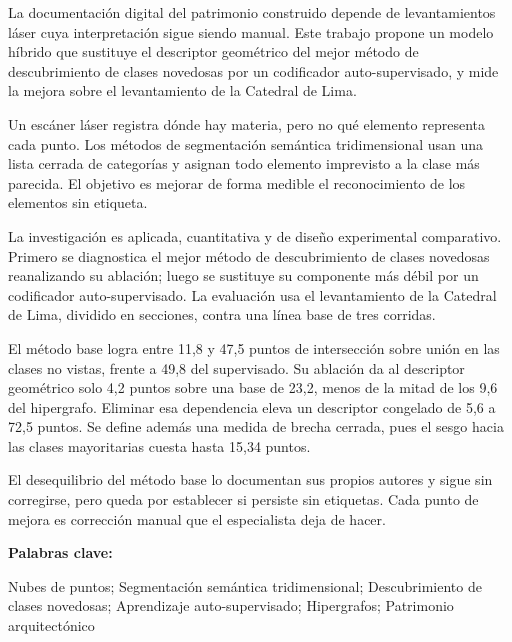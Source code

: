 
La documentación digital del patrimonio construido depende de levantamientos
láser cuya interpretación sigue siendo manual. Este trabajo propone un modelo
híbrido que sustituye el descriptor geométrico del mejor método de descubrimiento
de clases novedosas por un codificador auto-supervisado, y mide la mejora sobre
el levantamiento de la Catedral de Lima.

Un escáner láser registra dónde
hay materia, pero no qué elemento representa cada punto. Los métodos de
segmentación semántica tridimensional usan una lista cerrada de categorías y
asignan todo elemento imprevisto a la clase más parecida. El objetivo es
mejorar de forma medible el reconocimiento de los elementos sin etiqueta.

La investigación es aplicada, cuantitativa y
de diseño experimental comparativo. Primero se diagnostica el mejor método de
descubrimiento de clases novedosas reanalizando su ablación; luego se sustituye
su componente más débil por un codificador auto-supervisado. La evaluación usa
el levantamiento de la Catedral de Lima, dividido en secciones, contra una línea
base de tres corridas.

El método base logra entre 11,8 y 47,5 puntos de
intersección sobre unión en las clases no vistas, frente a 49,8 del supervisado.
Su ablación da al descriptor geométrico solo 4,2 puntos sobre una base de 23,2,
menos de la mitad de los 9,6 del hipergrafo. Eliminar esa dependencia eleva un
descriptor congelado de 5,6 a 72,5 puntos. Se define además una medida de
brecha cerrada, pues el sesgo hacia las clases mayoritarias cuesta hasta 15,34
puntos.

El desequilibrio del método base lo documentan sus
propios autores y sigue sin corregirse, pero queda por establecer si persiste
sin etiquetas. Cada punto de mejora es corrección manual que el especialista
deja de hacer.

\vspace{1em}

\noindent\begin{minipage}{\linewidth}
\noindent\textbf{Palabras clave:}\par
\noindent Nubes de puntos; Segmentación semántica tridimensional; Descubrimiento
de clases novedosas; Aprendizaje auto-supervisado; Hipergrafos; Patrimonio
arquitectónico
\end{minipage}
